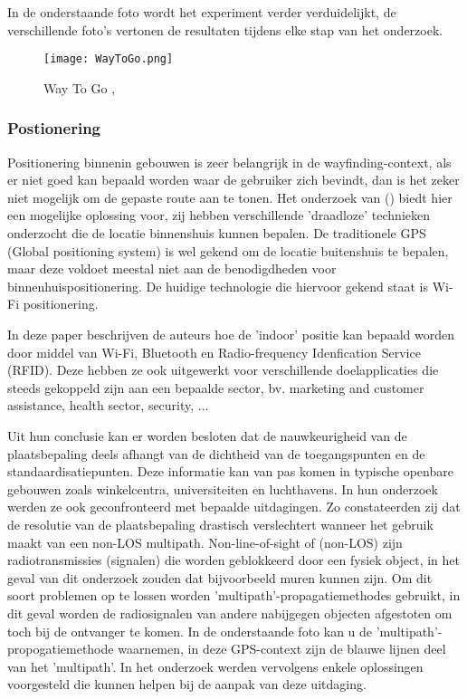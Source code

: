 In de onderstaande foto wordt het experiment verder verduidelijkt, de verschillende foto's vertonen de resultaten tijdens elke stap van het onderzoek.

\begin{figure}[H]
	\centering
	\texttt{[image: WayToGo.png]}
	\caption{Way To Go , \autocite{Haikun2017}}
\end{figure}

\subsubsection{Postionering}
Positionering binnenin gebouwen is zeer belangrijk in de wayfinding-context, als er niet goed kan bepaald worden waar de gebruiker zich bevindt, dan is het zeker niet mogelijk om de gepaste route aan te tonen. Het onderzoek van \textcite{Hasan2019} () biedt hier een mogelijke oplossing voor, zij hebben verschillende 'draadloze' technieken onderzocht die de locatie binnenshuis kunnen bepalen. De traditionele GPS (Global positioning system) is wel gekend om de locatie buitenshuis te bepalen, maar deze voldoet meestal niet aan de benodigdheden voor binnenhuispositionering. De huidige technologie die hiervoor gekend staat is Wi-Fi positionering.

In deze paper beschrijven de auteurs hoe de 'indoor' positie kan bepaald worden door middel van Wi-Fi, Bluetooth en Radio-frequency Idenfication Service (RFID). Deze hebben ze ook uitgewerkt voor verschillende doelapplicaties die steeds gekoppeld zijn aan een bepaalde sector, bv. marketing and customer assistance, health sector, security, ...

Uit hun conclusie kan er worden besloten dat de nauwkeurigheid van de plaatsbepaling deels afhangt van de dichtheid van de toegangspunten en de standaardisatiepunten. Deze informatie kan van pas komen in typische openbare gebouwen zoals winkelcentra, universiteiten en luchthavens. In hun onderzoek werden ze ook geconfronteerd met bepaalde uitdagingen. Zo constateerden zij dat de resolutie van de plaatsbepaling drastisch verslechtert wanneer het gebruik maakt van een non-LOS multipath. Non-line-of-sight of (non-LOS) zijn radiotransmissies (signalen) die worden geblokkeerd door een fysiek object, in het geval van dit onderzoek zouden dat bijvoorbeeld muren kunnen zijn. Om dit soort problemen op te lossen worden 'multipath'-propagatiemethodes gebruikt, in dit geval worden de radiosignalen van andere nabijgegen objecten afgestoten om toch bij de ontvanger te komen. In de onderstaande foto kan u de 'multipath'-propogatiemethode waarnemen, in deze GPS-context zijn de blauwe lijnen deel van het 'multipath'. In het onderzoek werden vervolgens enkele oplossingen voorgesteld die kunnen helpen bij de aanpak van deze uitdaging.

